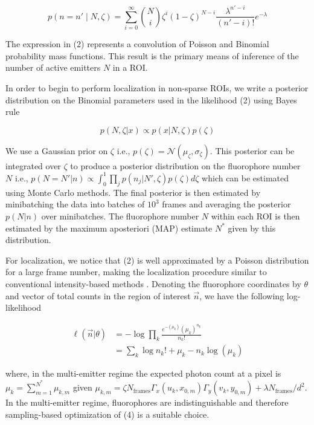 \documentclass[a4paper, twocolumn, superscriptaddress,prl]{revtex4}  %
\begin{document}
\begin{equation}
p(n=n' \mid N, \zeta) = \sum_{i=0}^{\infty} \binom{N}{i} \zeta^i (1-\zeta)^{N-i} \frac{\lambda^{n'-i}}{(n'-i)!} e^{-\lambda}
\end{equation}

The expression in (2) represents a convolution of Poisson and Binomial probability mass functions. This result is the primary means of inference of the number of active emitters $N$ in a ROI.

In order to begin to perform localization in non-sparse ROIs, we write a posterior distribution on the Binomial parameters used in the likelihood (2) using Bayes rule

\begin{equation*}
p(N,\zeta|x) \propto p(x|N,\zeta)p(\zeta)
\end{equation*}

We use a Gaussian prior on $\zeta$ i.e., $p(\zeta) = \mathcal{N}(\mu_{\zeta},\sigma_{\zeta})$. This posterior can be integrated over $\zeta$ to produce a posterior distribution on the fluorophore number $N$ i.e., $p(N=N'|n) \propto \int_{0}^{1} \prod_{j} p(n_{j}|N',\zeta)p(\zeta) d\zeta$ which can be estimated using Monte Carlo methods. The final posterior is then estimated by minibatching the data into batches of $10^3$ frames and averaging the posterior $p(N|n)$ over minibatches. The fluorophore number $N$ within each ROI is then estimated by the maximum aposteriori (MAP) estimate $N^{*}$ given by this distribution.

For localization, we notice that (2) is well approximated by a Poisson distribution for a large frame number, making the localization procedure similar to conventional intensity-based methods \citep{Smith2010}. Denoting the fluorophore coordinates by $\theta$ and vector of total counts in the region of interest $\vec{n}$, we have the following log-likelihood

\begin{align}
\ell(\vec{n}|\theta) &= -\log \prod_{k} \frac{e^{-\left(\mu_{k}\right)}\left(\mu_{k}\right)^{n_{k}}}{n_{k}!}\\
&= \sum_{k}  \log n_{k}! + \mu_{k} - n_{k}\log\left(\mu_{k}\right)
\end{align}

where, in the multi-emitter regime the expected photon count at a pixel is $\mu_{k} = \sum_{m=1}^{N^{*}} \mu_{k,m}$ given $\mu_{k,m}=\zeta N_{\mathrm{frames}}\Gamma_{x}(u_k,x_{0,m})\Gamma_{y}(v_k,y_{0,m}) + \lambda N_{\mathrm{frames}}/d^{2}$. In the multi-emitter regime, fluorophores are indistinguishable and therefore sampling-based optimization of (4) is a suitable choice. 
\end{document}
